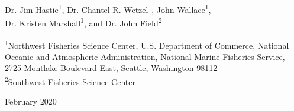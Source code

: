 
\begin{center}
\thispagestyle{empty}

\vspace{.5cm}


Dr. Jim Hastie\textsuperscript{1}, Dr. Chantel R. Wetzel\textsuperscript{1}, John Wallace\textsuperscript{1},\\
Dr. Kristen Marshall\textsuperscript{1}, and Dr. John Field\textsuperscript{2}\\


\vspace{.5cm}

\small
\textsuperscript{1}Northwest Fisheries Science Center, U.S. Department of Commerce, National Oceanic and Atmospheric Administration, National Marine Fisheries Service, 2725 Montlake Boulevard East, Seattle, Washington 98112\\

\textsuperscript{2}Southwest Fisheries Science Center\\

\vspace{1.5cm}


\vfill
February 2020

\vspace{1cm}


\vspace{.3cm}

\end{center}

\newpage



\maketitle


\setcounter{page}{1}



